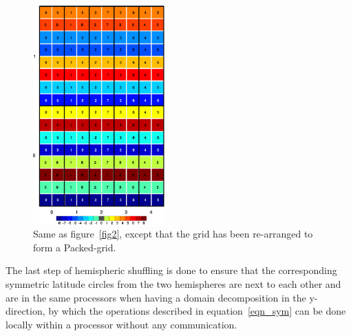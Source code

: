 \documentclass{SBCbookchapter}
\begin{document}
\begin{figure}
	\centering
	\captionsetup{width=.4\textwidth}
	\includegraphics[width=0.45\textwidth]{fourier_dom.eps}
	\caption{Same as figure~\ref{fig2}, except that the grid has been re-arranged to form a Packed-grid.}
	\label{fig4}
\end{figure}

The last step of hemispheric shuffling is done to ensure that the corresponding symmetric latitude circles from the two hemispheres are next to each other and are in the same processors when having a domain decomposition in the y-direction, by which the operations described in  equation~\ref{eqn_sym} can be done locally within a processor without any communication.





\end{document}
